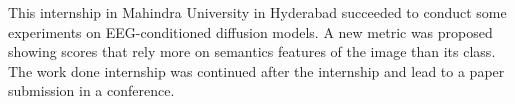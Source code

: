 This internship in Mahindra University in Hyderabad succeeded to conduct some
experiments on EEG-conditioned diffusion models. A new metric was proposed
showing scores that rely more on semantics features of the image than its class.
The work done internship was continued after the internship and lead to a paper
submission in a conference.
